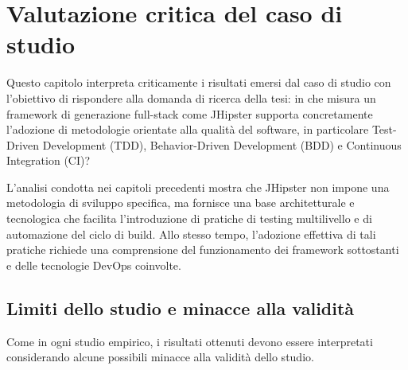 
\chapter{Valutazione critica del caso di studio}
\label{cap:evaluation}

Questo capitolo interpreta criticamente i risultati emersi dal caso di studio con l’obiettivo di rispondere alla domanda di ricerca della tesi: in che misura un framework di generazione full-stack come JHipster supporta concretamente l’adozione di metodologie orientate alla qualità del software, in particolare Test-Driven Development (TDD), Behavior-Driven Development (BDD) e Continuous Integration (CI)?

L’analisi condotta nei capitoli precedenti mostra che JHipster non impone una metodologia di sviluppo specifica, ma fornisce una base architetturale e tecnologica che facilita l’introduzione di pratiche di testing multilivello e di automazione del ciclo di build. Allo stesso tempo, l’adozione effettiva di tali pratiche richiede una comprensione del funzionamento dei framework sottostanti e delle tecnologie DevOps coinvolte.

\section{Limiti dello studio e minacce alla validità}
\label{sec:evaluation-validity}

Come in ogni studio empirico, i risultati ottenuti devono essere interpretati considerando alcune possibili minacce alla validità dello studio.

